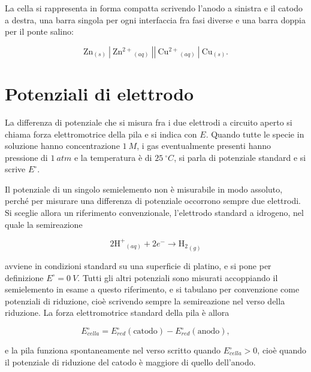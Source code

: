 La cella si rappresenta in forma compatta scrivendo l'anodo a sinistra e il catodo a destra, una barra singola per ogni interfaccia fra fasi diverse e una barra doppia per il ponte salino:

\begin{equation}
    \mathrm{Zn}_{(s)} \ | \ \mathrm{Zn^{2+}}_{(aq)} \ || \ \mathrm{Cu^{2+}}_{(aq)} \ | \ \mathrm{Cu}_{(s)} .
    \label{eq:notazione_cella}
\end{equation}
 
\newpage

\section{Potenziali di elettrodo}
 
La differenza di potenziale che si misura fra i due elettrodi a circuito aperto si chiama forza elettromotrice della pila e si indica con $E$.
Quando tutte le specie in soluzione hanno concentrazione $1 \ M$, i gas eventualmente presenti hanno pressione di $1 \ atm$ e la temperatura è di $25 \ ^\circ C$, si parla di potenziale standard e si scrive $E^\circ$.
 
Il potenziale di un singolo semielemento non è misurabile in modo assoluto, perché per misurare una differenza di potenziale occorrono sempre due elettrodi.
Si sceglie allora un riferimento convenzionale, l'elettrodo standard a idrogeno, nel quale la semireazione

\begin{equation*}
    2\mathrm{H^+}_{(aq)} + 2e^- \longrightarrow \mathrm{H_2}_{(g)}
\end{equation*}

avviene in condizioni standard su una superficie di platino, e si pone per definizione $E^\circ = 0 \ V$.
Tutti gli altri potenziali sono misurati accoppiando il semielemento in esame a questo riferimento, e si tabulano per convenzione come potenziali di riduzione, cioè scrivendo sempre la semireazione nel verso della riduzione.
La forza elettromotrice standard della pila è allora

\begin{equation}
    E^\circ_{cella} = E^\circ_{red}(\text{catodo}) - E^\circ_{red}(\text{anodo}) ,
    \label{eq:fem_standard}
\end{equation}

e la pila funziona spontaneamente nel verso scritto quando $E^\circ_{cella} > 0$, cioè quando il potenziale di riduzione del catodo è maggiore di quello dell'anodo.

